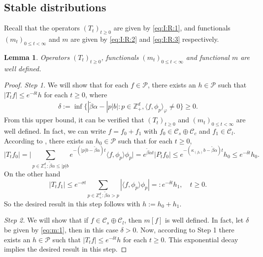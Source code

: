 \documentclass[12pt,a4paper]{amsart}
\theoremstyle{plain}
\newtheorem{lem}[thm]{Lemma}
\theoremstyle{definition}
\numberwithin{equation}{section}
\begin{document}
\subsection{Stable distributions}
\label{sec: stable distributions}
Recall that the operators $(T_t)_{t\geq 0}$ are given by \eqref{eq:I:R:1}, and functionals $(m_{t})_{0\leq t< \infty}$ and $m$ are given by \eqref{eq:I:R:2} and \eqref{eq:I:R:3} respectively.
\begin{lem}
  \label{lem:m}
      Operators $(T_t)_{t\geq 0}$, functionals $(m_{t})_{0\leq t< \infty}$ and functional $m$ are well defined. 
\end{lem}
\begin{proof}
  \emph{Step 1.} We will show that for each $f \in \mathcal P$, there exists an $h \in \mathcal P$ such that
\(      
|T_tf| 
      \leq  e^{- \delta t} h
\)    
for each $t\geq 0$,
where 
    \begin{align}
      \label{eq:m:1}
      \delta 
      := \inf \big\{ |\tilde \beta \alpha - |p|b| : p \in \mathbb Z_+^d, \langle f, \phi_p\rangle_\varphi \neq 0 \big\}
      \geq 0.
    \end{align}
    From this upper bound, it can be verified that $(T_t)_{t\geq 0}$ and $(m_{t})_{0 \leq t < \infty}$ are well defined.
    In fact, we can write $f = f_0 + f_1$ with $f_0\in \mathcal C_s \oplus \mathcal C_c$ and $f_1 \in \mathcal C_l$.
    According to \cite[Lemma 2.7]{MarksMilos2018CLT}, there exists an $h_0 \in \mathcal P$ such that for each $t\geq 0$,
    \[
      |T_t f_0| 
      = \Big| \sum_{p \in  \mathbb Z_+^d: \tilde \beta \alpha \leq |p|b } e^{- ( |p| b - \tilde \beta \alpha ) t} \langle f, \phi_p \rangle \phi_p \Big|
      = e^{\tilde \beta \alpha t} | P_t f_0 |
      \leq e^{- ( \kappa_{(f_0)} b - \tilde \beta \alpha) t} h_0
      \leq e^{- \delta t} h_0.
    \]
  On the other hand 
  \[
    |T_t f_1| 
    \leq e^{- \sigma t}\sum_{p \in \mathbb Z_+^d : \tilde \beta \alpha > p}
    |\langle f, \phi_p \rangle \phi_p|
    =: e^{- \delta t} h_1,
    \quad t\geq 0.
  \]
  So the desired result in this step follows with $h := h_0 + h_1$.
 
  \emph{Step 2.} We will show that if $f \in \mathcal C_s \oplus \mathcal C_l$, then $m[f]$ is well defined.
  In fact, let $\delta$ be given by \eqref{eq:m:1}, then in this case $\delta > 0$. 
  Now, according to Step 1 there exists an $h \in \mathcal P$ such that $|T_tf| \leq e^{- \delta t} h$ for each $t\geq 0$.
  This exponential decay implies the desired result in this step.
  

\end{proof}
\end{document}
